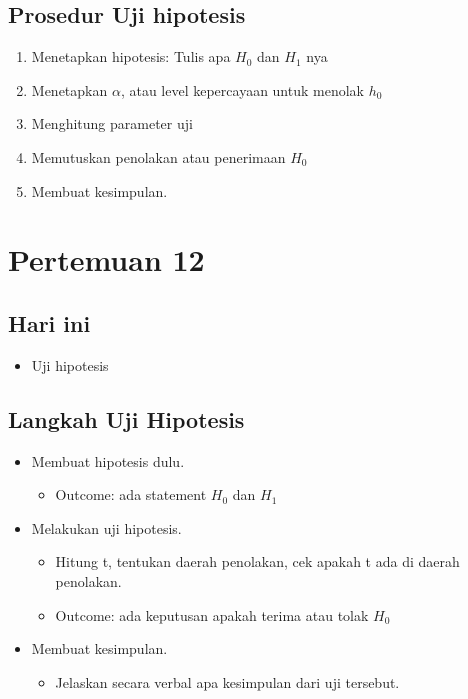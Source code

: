 \documentclass[
  letterpaper,
  DIV=11,
  numbers=noendperiod]{scrartcl}
\providecommand{\tightlist}{%
  \setlength{\itemsep}{0pt}\setlength{\parskip}{0pt}}\usepackage{longtable,booktabs,array}
\begin{document}
\hypertarget{prosedur-uji-hipotesis}{%
\subsection{Prosedur Uji hipotesis}\label{prosedur-uji-hipotesis}}

\begin{enumerate}
\def\labelenumi{\arabic{enumi}.}
\tightlist
\item
  Menetapkan hipotesis: Tulis apa \(H_0\) dan \(H_1\) nya
\item
  Menetapkan \(\alpha\), atau level kepercayaan untuk menolak \(h_0\)
\item
  Menghitung parameter uji
\item
  Memutuskan penolakan atau penerimaan \(H_0\)
\item
  Membuat kesimpulan.
\end{enumerate}

\hypertarget{pertemuan-12}{%
\section{Pertemuan 12}\label{pertemuan-12}}

\hypertarget{hari-ini-2}{%
\subsection{Hari ini}\label{hari-ini-2}}

\begin{itemize}
\tightlist
\item
  Uji hipotesis
\end{itemize}

\hypertarget{langkah-uji-hipotesis}{%
\subsection{Langkah Uji Hipotesis}\label{langkah-uji-hipotesis}}

\begin{itemize}
\item
  Membuat hipotesis dulu.

  \begin{itemize}
  \tightlist
  \item
    Outcome: ada statement \(H_0\) dan \(H_1\)
  \end{itemize}
\item
  Melakukan uji hipotesis.

  \begin{itemize}
  \item
    Hitung t, tentukan daerah penolakan, cek apakah t ada di daerah
    penolakan.
  \item
    Outcome: ada keputusan apakah terima atau tolak \(H_0\)
  \end{itemize}
\item
  Membuat kesimpulan.

  \begin{itemize}
  \tightlist
  \item
    Jelaskan secara verbal apa kesimpulan dari uji tersebut.
  \end{itemize}
\end{itemize}
\end{document}
